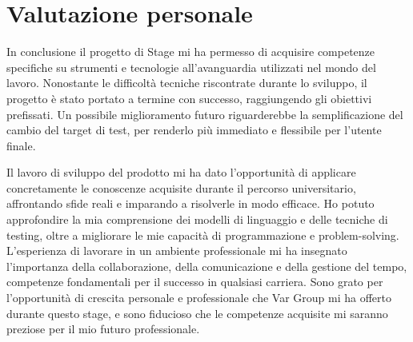 \section{Valutazione personale}
In conclusione il progetto di Stage mi ha permesso di acquisire competenze specifiche su strumenti e tecnologie all'avanguardia utilizzati nel mondo del lavoro.
Nonostante le difficoltà tecniche riscontrate durante lo sviluppo, il progetto è stato portato a termine con successo, raggiungendo gli obiettivi prefissati. Un possibile miglioramento futuro riguarderebbe la semplificazione del cambio del target di test, per renderlo più immediato e flessibile per l'utente finale.

Il lavoro di sviluppo del prodotto mi ha dato l'opportunità di applicare concretamente le conoscenze acquisite durante il percorso universitario, affrontando sfide reali e imparando a risolverle in modo efficace. Ho potuto approfondire la mia comprensione dei modelli di linguaggio e delle tecniche di testing, oltre a migliorare le mie capacità di programmazione e problem-solving.
L'esperienza di lavorare in un ambiente professionale mi ha insegnato l'importanza della collaborazione, della comunicazione e della gestione del tempo, competenze fondamentali per il successo in qualsiasi carriera. Sono grato per l'opportunità di crescita personale e professionale che Var Group mi ha offerto durante questo stage, e sono fiducioso che le competenze acquisite mi saranno preziose per il mio futuro professionale.
